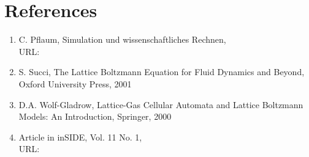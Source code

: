 
\section{References}
\begin{enumerate}
\item
C. Pflaum, Simulation und wissenschaftliches Rechnen,\\
\sloppy
URL: 
\item
S. Succi, The Lattice Boltzmann Equation for Fluid Dynamics and Beyond, Oxford University Press, 2001
\item
D.A. Wolf-Gladrow, Lattice-Gas Cellular Automata and Lattice Boltzmann Models: An Introduction, Springer, 2000
\item
Article in inSIDE, Vol. 11 No. 1,\\
\sloppy
URL: 
\end{enumerate}


